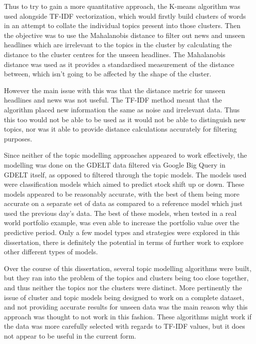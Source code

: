 Thus to try to gain a more quantitative approach, the K-means algorithm was used alongside TF-IDF vectorization, which would  firstly build clusters of words in an attempt to collate the individual topics present into those clusters. Then the objective was to use the Mahalanobis distance to filter out news and unseen headlines which are irrelevant to the topics in the cluster by calculating the distance to the cluster centres for the unseen headlines. The Mahalanobis distance was used as it provides a standardised measurement of the distance between, which isn't going to be affected by the shape of the cluster. 

However the main issue with this was that the distance metric for unseen headlines and news was not useful. The TF-IDF method meant that the algorithm placed new information the same as noise and irrelevant data. Thus this too would not be able to be used as it would not be able to distinguish new topics, nor was it able to provide distance calculations accurately for filtering purposes. 

Since neither of the topic modelling approaches appeared to work effectively, the modelling was done on the GDELT data filtered via Google Big Query in GDELT itself, as opposed to filtered through the topic models. The models used were classification models which aimed to predict stock shift up or down. These models appeared to be reasonably accurate, with the best of them being more accurate on a separate set of data as compared to a reference model which just used the previous day's data. The best of these models, when tested in a real world portfolio example, was even able to increase the portfolio value over the predictive period. Only a few model types and strategies were explored in this dissertation, there is definitely the potential in terms of further work to explore other different types of models.

Over the course of this dissertation, several topic modelling algorithms were built, but they ran into the problem of the topics and clusters being too close together, and thus neither the topics nor the clusters were distinct. More pertinently the issue of cluster and topic models being designed to work on a complete dataset, and not providing accurate results for unseen data was the main reason why this approach was thought to not work in this fashion. These algorithms might work if the data was more carefully selected with regards to TF-IDF values, but it does not appear to be useful in the current form. 

